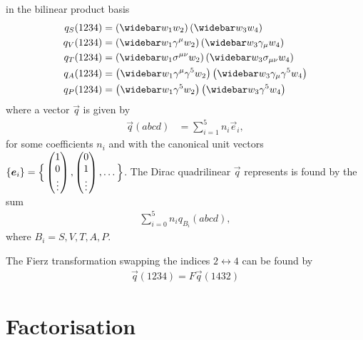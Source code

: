 \documentclass[english,notitlepage]{article}
\begin{document}
    in the bilinear product basis
    \begin{subequations}
        \begin{align}
            q_S(1234) & = \pclosed{\wbar{w}_1 w_2} \pclosed{\wbar{w}_3 w_4}                                         \\
            q_V(1234) & = \pclosed{\wbar{w}_1 \gamma^\mu w_2} \pclosed{\wbar{w}_3 \gamma_\mu w_4}                   \\
            q_T(1234) & = \pclosed{\wbar{w}_1 \sigma^{\mu\nu} w_2} \pclosed{\wbar{w}_3 \sigma_{\mu\nu} w_4}         \\
            q_A(1234) & = \pclosed{\wbar{w}_1 \gamma^\mu \gamma^5 w_2} \pclosed{\wbar{w}_3 \gamma_\mu \gamma^5 w_4} \\
            q_P(1234) & = \pclosed{\wbar{w}_1 \gamma^5 w_2} \pclosed{\wbar{w}_3 \gamma^5 w_4}                       \\
        \end{align}
    \end{subequations}
    where a vector \(\vec{q}\) is given by
    \begin{align}
        \vec{q}(abcd) & = \sum_{i=1}^5 n_i \vec{e}_i,
    \end{align}
    for some coefficients \(n_i\) and with the canonical unit vectors \(\left\{\boldsymbol{e}_i\right\} = \Big\{\begin{pmatrix} 1\\0\\\vdots \end{pmatrix}, \begin{pmatrix} 0\\1\\\vdots \end{pmatrix}, \ldots \Big\}\).
    The Dirac quadrilinear \(\vec{q}\) represents is found by the sum
    \begin{align}
        \sum_{i=0}^{5} n_i q_{B_i}(abcd),
    \end{align}
    where \(B_i = S, V, T, A, P\).

    The Fierz transformation swapping the indices \(2 \leftrightarrow 4\) can be found by
    \begin{align}
        \vec{q}(1234) = F \vec{q}(1432)
    \end{align}

\section{Factorisation}
\end{document}
